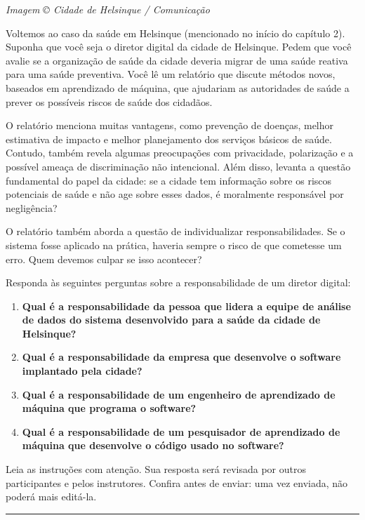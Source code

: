 \documentclass[
  11pt,
]{article}
\begin{document}
\emph{Imagem © Cidade de Helsinque / Comunicação}

Voltemos ao caso da saúde em Helsinque (mencionado no início do capítulo
2). Suponha que você seja o diretor digital da cidade de Helsinque.
Pedem que você avalie se a organização de saúde da cidade deveria migrar
de uma saúde reativa para uma saúde preventiva. Você lê um relatório que
discute métodos novos, baseados em aprendizado de máquina, que ajudariam
as autoridades de saúde a prever os possíveis riscos de saúde dos
cidadãos.

O relatório menciona muitas vantagens, como prevenção de doenças, melhor
estimativa de impacto e melhor planejamento dos serviços básicos de
saúde. Contudo, também revela algumas preocupações com privacidade,
polarização e a possível ameaça de discriminação não intencional. Além
disso, levanta a questão fundamental do papel da cidade: se a cidade tem
informação sobre os riscos potenciais de saúde e não age sobre esses
dados, é moralmente responsável por negligência?

O relatório também aborda a questão de individualizar responsabilidades.
Se o sistema fosse aplicado na prática, haveria sempre o risco de que
cometesse um erro. Quem devemos culpar se isso acontecer?

Responda às seguintes perguntas sobre a responsabilidade de um diretor
digital:

\begin{enumerate}
\def\labelenumi{\arabic{enumi}.}
\item
  \textbf{Qual é a responsabilidade da pessoa que lidera a equipe de
  análise de dados do sistema desenvolvido para a saúde da cidade de
  Helsinque?}
\item
  \textbf{Qual é a responsabilidade da empresa que desenvolve o software
  implantado pela cidade?}
\item
  \textbf{Qual é a responsabilidade de um engenheiro de aprendizado de
  máquina que programa o software?}
\item
  \textbf{Qual é a responsabilidade de um pesquisador de aprendizado de
  máquina que desenvolve o código usado no software?}
\end{enumerate}

Leia as instruções com atenção. Sua resposta será revisada por outros
participantes e pelos instrutores. Confira antes de enviar: uma vez
enviada, não poderá mais editá-la.

\begin{center}\rule{0.5\linewidth}{0.5pt}\end{center}
\end{document}
